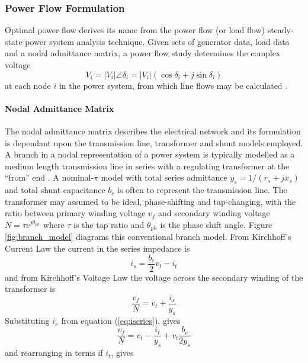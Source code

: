 \subsubsection{Power Flow Formulation}
\label{sec:pf_form}
Optimal power flow derives its name from the power flow (or load flow)
steady-state power system analysis technique.  Given sets of generator data,
load data and a nodal admittance matrix, a power flow study determines the
complex voltage
\begin{equation}
V_i = \vert V_i \vert \angle\delta_i = \vert
V_i\vert(\cos\delta_i + j\sin\delta_i)
\end{equation}
at each node $i$ in the power system, from which line flows may be calculated
\cite{grainger:psa}.

\paragraph{Nodal Admittance Matrix}
The nodal admittance matrix describes the electrical network and its formulation
is dependant upon the transmission line, transformer and shunt models employed.
A branch in a nodal representation of a power system is typically modelled as a
medium length transmission line in series with a regulating transformer at the
``from'' end \cite[p.11]{pserc:mp_manual}. A nominal-$\pi$ model with total
series admittance $y_s = 1/(r_s+jx_s)$ and total shunt capacitance $b_c$ is
often to represent the transmission line.  The transformer may assumed to be
ideal, phase-shifting and tap-changing, with the ratio between primary winding
voltage $v_{f}$ and secondary winding voltage $N = \tau e^{j\theta_{ph}}$ where
$\tau$ is the tap ratio and $\theta_{ph}$ is the phase shift angle. Figure
\ref{fig:branch_model} diagrams this conventional branch model.  From
Kirchhoff's Current Law the current in the series impedance is
\begin{equation}
\label{eq:iseries}
i_s = \frac{b_c}{2}v_t - i_t
\end{equation}
and from Kirchhoff's Voltage Law the voltage across the secondary winding of
the transformer is
\begin{equation}
\frac{v_{f}}{N} = v_t + \frac{i_s}{y_s}
\end{equation}
Substituting $i_s$ from equation (\ref{eq:iseries}), gives
\begin{equation}
\label{eq:vfrom}
\frac{v_{f}}{N} = v_t - \frac{i_t}{y_s} + v_t\frac{b_c}{2y_s}
\end{equation}
and rearranging in terms if $i_t$, gives
